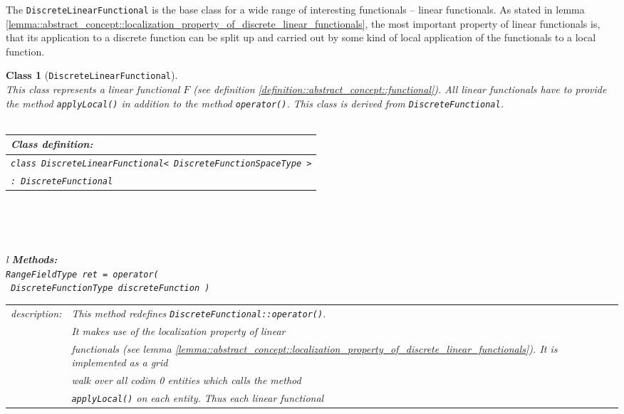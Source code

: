 \documentclass[a4paper,11pt]{article}
\numberwithin{equation}{section}
\newtheorem{class}[definition]{Class}
\newcommand{\theoremNewline}{\hspace{1mm}\\}
\newcommand{\Code}[1]{\texttt{#1}}
\newcommand{\CodeT}[1]{\textnormal{\texttt{#1}}}
\newcommand{\codeT}[1]{\textnormal{\lstinline!#1!}}
\begin{document}
      The \Code{DiscreteLinearFunctional} is the base class for a wide range of interesting functionals -- linear
      functionals. As stated in lemma
      \ref{lemma::abstract_concept::localization_property_of_discrete_linear_functionals},
      the most important property of linear functionals is, that its application to a discrete function can be split up
      and carried out by some kind of local application of the functionals to a local function.

      \begin{class}[\CodeT{DiscreteLinearFunctional}]\theoremNewline
        This class represents a linear functional $F$ (see definition \ref{definition::abstract_concept::functional}).
        All linear functionals have to provide the method \CodeT{applyLocal()} in addition to the method
        \CodeT{operator()}. This class is derived from \codeT{DiscreteFunctional}.\\\\
        \begin{tabular}{l}
          \textbf{Class definition:}\\
          \hline
          \hline
          \codeT{class DiscreteLinearFunctional< DiscreteFunctionSpaceType >}\\
          \codeT{: DiscreteFunctional}
        \end{tabular}\\\\\\
        \noindent
        \begin{longtable}{l}
          \textbf{Methods:}\\
          \hline
          \hline
          \CodeT{RangeFieldType ret = operator(}\\
          \CodeT{ DiscreteFunctionType discreteFunction )}\\
          \begin{tabular}{l|l}
            description:
              & This method redefines \codeT{DiscreteFunctional::operator()}.\\
              & It makes use of the localization property of linear\\
              & functionals (see lemma
                \ref{lemma::abstract_concept::localization_property_of_discrete_linear_functionals}). It is implemented
                as a grid\\
              & walk over all codim 0 entities which calls the method\\
              & \CodeT{applyLocal()} on each entity. Thus each linear functional\\

\end{tabular}
\end{longtable}
\end{class}
\end{document}
